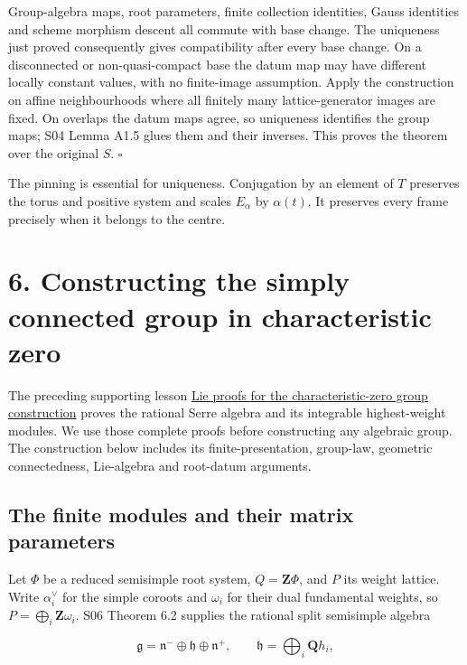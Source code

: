 \documentclass[11pt,a4paper,openany]{report}
\begin{document}
Group-algebra maps, root parameters, finite collection identities, Gauss identities and scheme morphism descent all commute with base change. The uniqueness just proved consequently gives compatibility after every base change. On a disconnected or non-quasi-compact base the datum map may have different locally constant values, with no finite-image assumption. Apply the construction on affine neighbourhoods where all finitely many lattice-generator images are fixed. On overlaps the datum maps agree, so uniqueness identifies the group maps; S04 Lemma A1.5 glues them and their inverses. This proves the theorem over the original \(S\). \(\square\)

The pinning is essential for uniqueness. Conjugation by an element of \(T\) preserves the torus and positive system and scales \(E_\alpha\) by \(\alpha(t)\). It preserves every frame precisely when it belongs to the centre.

\section{6. Constructing the simply connected group in characteristic zero}\label{AG-RG-05-constructing-the-simply-connected-group-in-characteristic-zero}

The preceding supporting lesson \href{https://github.com/KokunoYumeto/open-math-courses/blob/main/docs/courses/AG-RG/AG-RG-S06.md}{Lie proofs for the characteristic-zero group construction} proves the rational Serre algebra and its integrable highest-weight modules. We use those complete proofs before constructing any algebraic group. The construction below includes its finite-presentation, group-law, geometric connectedness, Lie-algebra and root-datum arguments.

\subsection{The finite modules and their matrix parameters}\label{AG-RG-05-the-finite-modules-and-their-matrix-parameters}

Let \(\Phi\) be a reduced semisimple root system, \(Q=\mathbf Z\Phi\), and \(P\) its weight lattice. Write \(\alpha_i^\vee\) for the simple coroots and \(\omega_i\) for their dual fundamental weights, so \(P=\bigoplus_i\mathbf Z\omega_i\). S06 Theorem 6.2 supplies the rational split semisimple algebra

\[
\mathfrak g=\mathfrak n^-\oplus\mathfrak h\oplus\mathfrak n^+,
\qquad
\mathfrak h=\bigoplus_i\mathbf Qh_i,
\]
\end{document}
